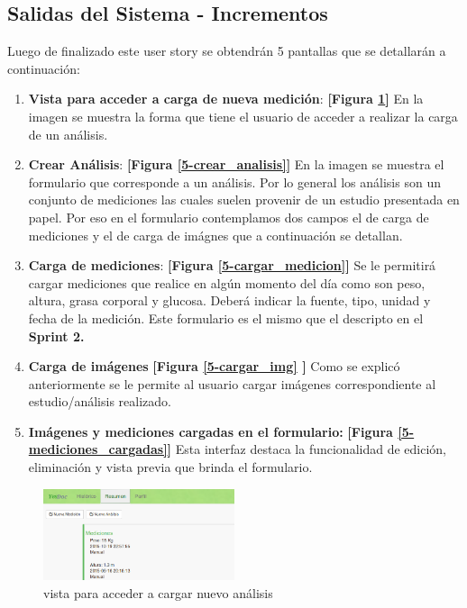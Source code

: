 \documentclass[a4paper,12pt]{article}
\begin{document}
\clearpage
\subsection {Salidas del Sistema - Incrementos}

Luego de finalizado este user story se obtendrán 5 pantallas que se detallarán a continuación:
\begin{enumerate}
	\item \textbf{Vista para acceder a carga de nueva medición}: \textbf{[Figura \ref{5-boton_nuevo_analisis}]} En la imagen se muestra la forma que tiene el usuario de acceder  a realizar la carga de un análisis.
    	\item \textbf{Crear Análisis}: \textbf{[Figura \ref{5-crear_analisis}]} En la imagen se muestra el formulario que corresponde a un análisis. Por lo general los análisis son un conjunto de mediciones las cuales suelen provenir de un estudio presentada en papel. Por eso en el formulario contemplamos dos campos el de carga de mediciones y el de carga de imágnes que a continuación se detallan.
        	\item \textbf{Carga de mediciones}: \textbf{[Figura \ref{5-cargar_medicion}]} Se le permitirá cargar mediciones que realice en algún momento del día como son peso, altura, grasa corporal y glucosa. Deberá indicar la fuente, tipo, unidad y fecha de la medición. Este formulario es el mismo que el descripto en el\textbf{ Sprint 2.}
    \item \textbf{Carga de imágenes}  \textbf{[Figura  \ref{5-cargar_img} ]} Como se explicó anteriormente se le permite al usuario cargar imágenes correspondiente al estudio/análisis realizado.

    \item \textbf{Imágenes y mediciones cargadas en el formulario:}  \textbf{[Figura \ref{5-mediciones_cargadas}]} Esta interfaz destaca la funcionalidad de edición, eliminación y vista previa que brinda el formulario.

\end{enumerate}

    
    \begin{figure}[h]
        \centering
        \includegraphics[width=0.5\textwidth]{img/5-boton_nuevo_analisis}
        \caption{vista para acceder a cargar nuevo análisis}
		\label{5-boton_nuevo_analisis}
    \end{figure}
    
\end{document}
